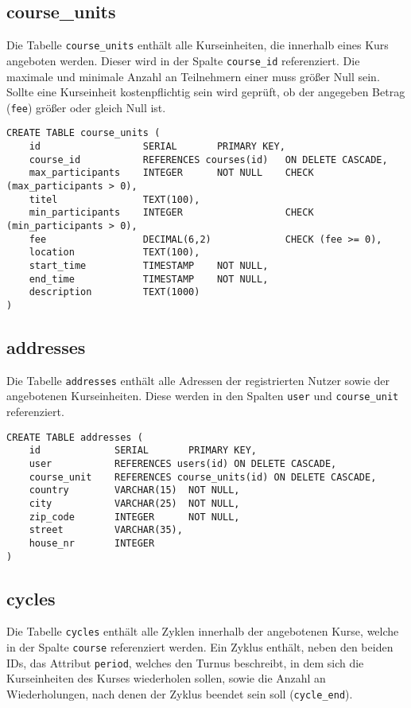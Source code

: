 \subsection{course\_units}
Die Tabelle \texttt{course_units} enthält alle Kurseinheiten, die innerhalb eines Kurs angeboten werden. Dieser wird in der Spalte \texttt{course_id} referenziert. Die maximale und minimale Anzahl an Teilnehmern einer muss größer Null sein. Sollte eine Kurseinheit kostenpflichtig sein wird geprüft, ob der angegeben Betrag (\texttt{fee}) größer oder gleich Null ist.

\begin{verbatim}
CREATE TABLE course_units (
    id                  SERIAL       PRIMARY KEY,
    course_id           REFERENCES courses(id)   ON DELETE CASCADE,
    max_participants    INTEGER      NOT NULL    CHECK (max_participants > 0),
    titel               TEXT(100),
    min_participants    INTEGER                  CHECK (min_participants > 0),
    fee                 DECIMAL(6,2)             CHECK (fee >= 0),
    location            TEXT(100),
    start_time          TIMESTAMP    NOT NULL,
    end_time            TIMESTAMP    NOT NULL,
    description         TEXT(1000)
)
\end{verbatim}

\subsection{addresses}
Die Tabelle \texttt{addresses} enthält alle Adressen der registrierten Nutzer sowie der angebotenen Kurseinheiten. Diese werden in den Spalten \texttt{user} und \texttt{course_unit} referenziert.

\begin{verbatim}
CREATE TABLE addresses (
    id             SERIAL       PRIMARY KEY,
    user           REFERENCES users(id) ON DELETE CASCADE,
    course_unit    REFERENCES course_units(id) ON DELETE CASCADE,
    country        VARCHAR(15)  NOT NULL,
    city           VARCHAR(25)  NOT NULL,
    zip_code       INTEGER      NOT NULL,
    street         VARCHAR(35),
    house_nr       INTEGER
)
\end{verbatim}

\subsection{cycles}
Die Tabelle \texttt{cycles} enthält alle Zyklen innerhalb der angebotenen Kurse, welche in der Spalte \texttt{course} referenziert werden. Ein Zyklus enthält, neben den beiden IDs, das Attribut \texttt{period}, welches den Turnus beschreibt, in dem sich die Kurseinheiten des Kurses wiederholen sollen, sowie die Anzahl an Wiederholungen, nach denen der Zyklus beendet sein soll (\texttt{cycle_end}).

